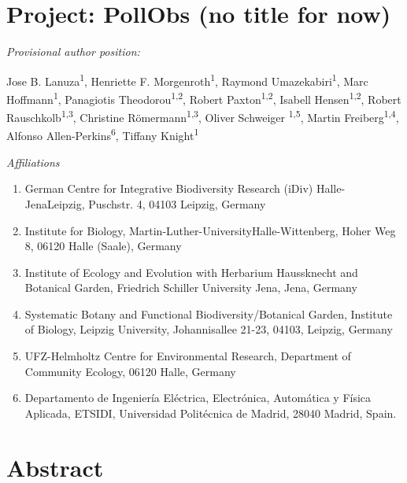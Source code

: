\documentclass[
  letterpaper,
  DIV=11,
  numbers=noendperiod]{scrartcl}
\author{}
\date{}
\providecommand{\tightlist}{%
  \setlength{\itemsep}{0pt}\setlength{\parskip}{0pt}}\usepackage{longtable,booktabs,array}
\begin{document}
\section{Project: PollObs (no title for
now)}\label{project-pollobs-no-title-for-now}

\emph{Provisional author position:}

Jose B. Lanuza\textsuperscript{1}, Henriette F.
Morgenroth\textsuperscript{1}, Raymond Umazekabiri\textsuperscript{1},
Marc Hoffmann\textsuperscript{1}, Panagiotis
Theodorou\textsuperscript{1,2}, Robert Paxton\textsuperscript{1,2},
Isabell Hensen\textsuperscript{1,2}, Robert
Rauschkolb\textsuperscript{1,3}, Christine
Römermann\textsuperscript{1,3}, Oliver Schweiger \textsuperscript{1,5},
Martin Freiberg\textsuperscript{1,4}, Alfonso
Allen-Perkins\textsuperscript{6}, Tiffany Knight\textsuperscript{1}

\emph{Affiliations}

\begin{enumerate}
\def\labelenumi{\arabic{enumi}.}
\tightlist
\item
  German Centre for Integrative Biodiversity Research (iDiv)
  Halle-JenaLeipzig, Puschstr. 4, 04103 Leipzig, Germany
\item
  Institute for Biology, Martin-Luther-UniversityHalle-Wittenberg, Hoher
  Weg 8, 06120 Halle (Saale), Germany
\item
  Institute of Ecology and Evolution with Herbarium Haussknecht and
  Botanical Garden, Friedrich Schiller University Jena, Jena, Germany
\item
  Systematic Botany and Functional Biodiversity/Botanical Garden,
  Institute of Biology, Leipzig University, Johannisallee 21-23, 04103,
  Leipzig, Germany
\item
  UFZ-Helmholtz Centre for Environmental Research, Department of
  Community Ecology, 06120 Halle, Germany
\item
  Departamento de Ingeniería Eléctrica, Electrónica, Automática y Física
  Aplicada, ETSIDI, Universidad Politécnica de Madrid, 28040 Madrid,
  Spain.
\end{enumerate}

\section{Abstract}\label{abstract}
\end{document}
